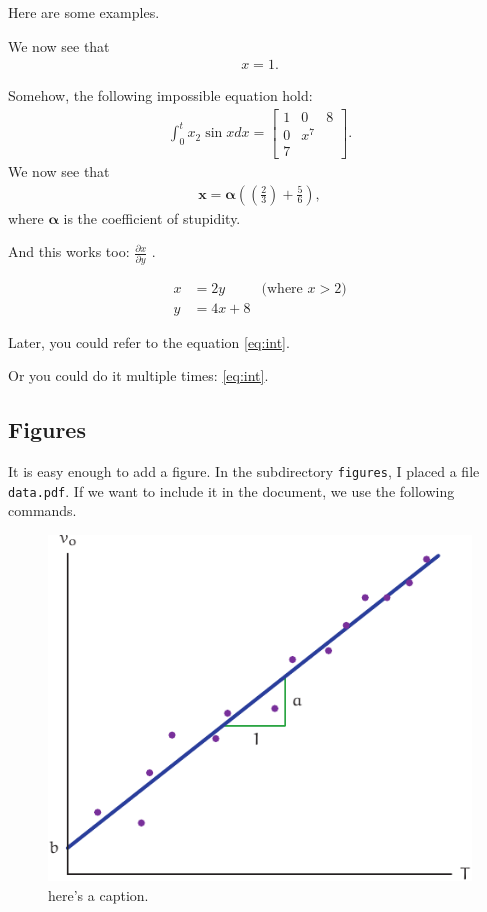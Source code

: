 \documentclass[10pt,twocolumn]{article}
\begin{document}
Here are some examples.

We now see that
\begin{align}
	x = 1 .
\end{align}

Somehow, the following impossible equation hold:
\begin{align} \label{eq:int}
	\int_0^t x_2 \sin{x} dx = 
	\begin{bmatrix}
		1 & 0 & 8 \\
		0 & x^7 \\
		7 &
	\end{bmatrix} .
\end{align}
We now see that 
\begin{align}
	\bm{x} = \bm{\alpha} 
    \left( 
    	\left(
        	\frac{2}{3}
        \right) + 
        \frac{5}{6} 
    \right) , 
\end{align}
where $\bm{\alpha}$ is the coefficient of stupidity.

And this works too: $\frac{\partial x}{\partial y}$ .

\begin{subequations}
\begin{align*}
	x &= 2 y & \text{(where $x>2$)} \\
	y &= 4 x + 8 &
\end{align*}
\end{subequations}

Later, you could refer to the equation \autoref{eq:int}.

Or you could do it multiple times: \autoref{eq:int}.

\subsection{Figures}
It is easy enough to add a figure. In the subdirectory \texttt{figures}, I placed a file \texttt{data.pdf}. If we want to include it in the document, we use the following commands.

\begin{figure}[bt]
	\centering
	\includegraphics[width=.9\linewidth]{figures/data.pdf}
	\caption{here's a caption.}
	\label{fig:data}
\end{figure}
\end{document}
